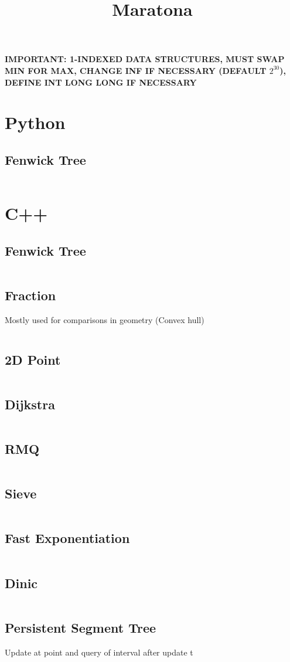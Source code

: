\documentclass{article}
\title{Maratona}
\author{}
\date{}
\begin{document}
\maketitle

\textbf{IMPORTANT: 1-INDEXED DATA STRUCTURES, MUST SWAP MIN FOR MAX,
CHANGE INF IF NECESSARY (DEFAULT $2^{30}$), DEFINE INT LONG LONG IF NECESSARY}

\tableofcontents
\newpage

\section{Python}
\subsection{Fenwick Tree}
\inputminted{python}{code/fenwick.py}

\section{C++}
\subsection{Fenwick Tree}
\inputminted[obeytabs=true,tabsize=4]{cpp}{code/fenwick.cpp}
\subsection{Fraction}
Mostly used for comparisons in geometry (Convex hull)
\inputminted[obeytabs=true,tabsize=4]{cpp}{code/fraction.cpp}
\subsection{2D Point}
\inputminted[obeytabs=true,tabsize=4]{cpp}{code/point.cpp}
\subsection{Dijkstra}
\inputminted[obeytabs=true,tabsize=4]{cpp}{code/dijkstra.cpp}
\subsection{RMQ}
\inputminted[obeytabs=true,tabsize=4]{cpp}{code/rmq.cpp}
\subsection{Sieve}
\inputminted[obeytabs=true,tabsize=4]{cpp}{code/sieve.cpp}
\subsection{Fast Exponentiation}
\inputminted[obeytabs=true,tabsize=4]{cpp}{code/fast_exp.cpp}
\subsection{Dinic}
\inputminted[obeytabs=true,tabsize=4]{cpp}{code/dinic.cpp}
\subsection{Persistent Segment Tree} 
Update at point and query of interval after update t
\inputminted[obeytabs=true,tabsize=4]{cpp}{code/persistentseg.cpp}
\end{document}

